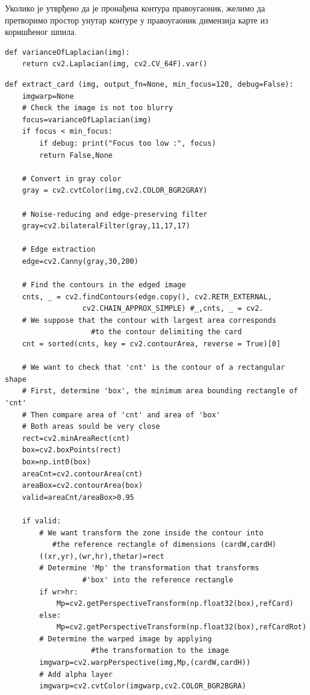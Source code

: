 \documentclass[12pt, а4paper]{article}
\begin{document}
Уколико је утврђено да је пронађена контура правоугаоник, желимо да претворимо простор унутар
контуре у правоугаоник димензија карте из коришћеног шпила.



\begin{verbatim}
def varianceOfLaplacian(img):
    return cv2.Laplacian(img, cv2.CV_64F).var()
\end{verbatim}
\newpage
\begin{verbatim}
def extract_card (img, output_fn=None, min_focus=120, debug=False):
    imgwarp=None    
    # Check the image is not too blurry
    focus=varianceOfLaplacian(img)
    if focus < min_focus: 
        if debug: print("Focus too low :", focus)
        return False,None
    
    # Convert in gray color
    gray = cv2.cvtColor(img,cv2.COLOR_BGR2GRAY)
    
    # Noise-reducing and edge-preserving filter
    gray=cv2.bilateralFilter(gray,11,17,17)
    
    # Edge extraction
    edge=cv2.Canny(gray,30,200)
    
    # Find the contours in the edged image
    cnts, _ = cv2.findContours(edge.copy(), cv2.RETR_EXTERNAL, 
			      cv2.CHAIN_APPROX_SIMPLE) #_,cnts, _ = cv2.    
    # We suppose that the contour with largest area corresponds 
				    #to the contour delimiting the card
    cnt = sorted(cnts, key = cv2.contourArea, reverse = True)[0]
    
    # We want to check that 'cnt' is the contour of a rectangular shape
    # First, determine 'box', the minimum area bounding rectangle of 'cnt'
    # Then compare area of 'cnt' and area of 'box'
    # Both areas sould be very close
    rect=cv2.minAreaRect(cnt)
    box=cv2.boxPoints(rect)
    box=np.int0(box)
    areaCnt=cv2.contourArea(cnt)
    areaBox=cv2.contourArea(box)
    valid=areaCnt/areaBox>0.95
    
    if valid:
        # We want transform the zone inside the contour into 
		   #the reference rectangle of dimensions (cardW,cardH)
        ((xr,yr),(wr,hr),thetar)=rect
        # Determine 'Mp' the transformation that transforms 
				  #'box' into the reference rectangle
        if wr>hr:
            Mp=cv2.getPerspectiveTransform(np.float32(box),refCard)
        else:
            Mp=cv2.getPerspectiveTransform(np.float32(box),refCardRot)
        # Determine the warped image by applying
				    #the transformation to the image
        imgwarp=cv2.warpPerspective(img,Mp,(cardW,cardH))
        # Add alpha layer
        imgwarp=cv2.cvtColor(imgwarp,cv2.COLOR_BGR2BGRA)
        

\end{verbatim}
\end{document}
